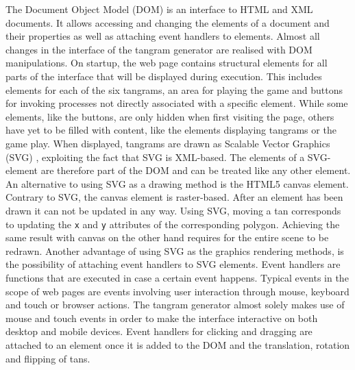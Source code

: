 The Document Object Model (DOM) is an interface to HTML and XML documents. It allows accessing and changing the elements of a document and their properties as well as attaching event handlers to elements. Almost all changes in the interface of the tangram generator are realised with DOM manipulations. On startup, the web page contains structural elements for all parts of the interface that will be displayed during execution. This includes elements for each of the six tangrams, an area for playing the game and buttons for invoking processes not directly associated with a specific element. While some elements, like the buttons, are only hidden when first visiting the page, others have yet to be filled with content, like the elements displaying tangrams or the game play. When displayed, tangrams are drawn as Scalable Vector Graphics (SVG) \cite{w3c11}, exploiting the fact that SVG is XML-based. The elements of a SVG-element are therefore part of the DOM and can be treated like any other element. An alternative to using SVG as a drawing method is the HTML5 canvas element. Contrary to SVG, the canvas element is raster-based. After an element has been drawn it can not be updated in any way. Using SVG, moving a tan corresponds to updating the \verb|x| and \verb|y| attributes of the corresponding polygon. Achieving the same result with canvas on the other hand requires for the entire scene to be redrawn.
Another advantage of using SVG as the graphics rendering methods, is the possibility of attaching event handlers to SVG elements. Event handlers are functions that are executed in case a certain event happens. Typical events in the scope of web pages are events involving user interaction through mouse, keyboard and touch or browser actions. The tangram generator almost solely makes use of mouse and touch events in order to make the interface interactive on both desktop and mobile devices. Event handlers for clicking and dragging are attached to an element once it is added to the DOM and the translation, rotation and flipping of tans. 

